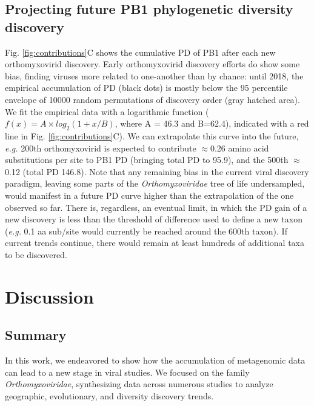 \documentclass[11pt]{article}
\begin{document}
\subsection*{Projecting future PB1 phylogenetic diversity discovery}

Fig. \ref{fig:contributions}C shows the cumulative PD of PB1 after each new orthomyxovirid discovery.
Early orthomyxovirid discovery efforts do show some bias, finding viruses more related to one-another than by chance: until 2018, the empirical accumulation of PD (black dots) is mostly below the 95 percentile envelope of 10000 random permutations of discovery order (gray hatched area).
We fit the empirical data with a logarithmic function ($f(x) = A \times log_{2} (1 + x/B)$, where A = 46.3 and B=62.4), indicated with a red line in Fig. \ref{fig:contributions}C).
We can extrapolate this curve into the future, \textit{e.g.} 200th orthomyxovirid is expected to contribute $\approx$0.26 amino acid substitutions per site to PB1 PD (bringing total PD to 95.9), and the 500th $\approx$0.12 (total PD 146.8).
Note that any remaining bias in the current viral discovery paradigm, leaving some parts of the \textit{Orthomyxoviridae} tree of life undersampled, would manifest in a future PD curve higher than the extrapolation of the one observed so far.
There is, regardless, an eventual limit, in which the PD gain of a new discovery is less than the threshold of difference used to define a new taxon (\textit{e.g.} 0.1 aa sub/site would currently be reached around the 600th taxon).
If current trends continue, there would remain at least hundreds of additional taxa to be discovered.




\section{Discussion}


\subsection{Summary}

In this work, we endeavored to show how the accumulation of metagenomic data can lead to a new stage in viral studies.
We focused on the family \textit{Orthomyxoviridae}, synthesizing data across numerous studies to analyze geographic, evolutionary, and diversity discovery trends.
\end{document}
